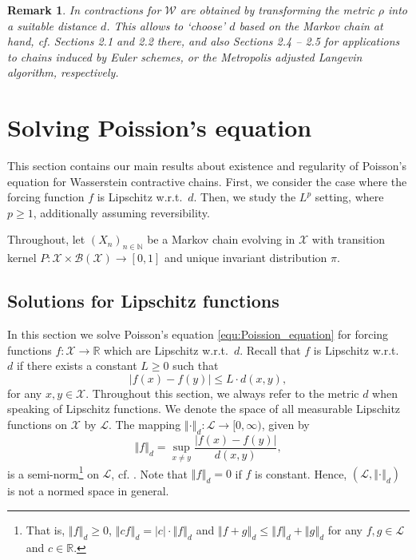 \documentclass[12pt]{article}
\theoremstyle{plain}
\newtheorem{rem}[thm]{Remark}
\newcommand{\norm}[1]{\left\Vert #1 \right\Vert}
\newcommand{\N}{\mathbb{N}}
\newcommand{\R}{\mathbb{R}}
\newcommand{\cX}{\mathcal{X}}
\begin{document}
{\begin{rem}
In \cite{eberle2019quantitative} contractions for $\mathcal{W}$ are obtained by transforming the metric $\rho$ into a suitable distance $d$.
This allows to `choose' $d$ based on the Markov chain at hand, cf. Sections 2.1 and 2.2 there, and also Sections 2.4 -- 2.5 for applications to chains induced by Euler schemes, or the Metropolis adjusted Langevin algorithm, respectively. 
\end{rem}



\section{Solving Poission's equation}\label{sec:Solutions}
This section contains our main results about existence and regularity of Poisson's equation for Wasserstein contractive chains. 
First, we consider the case where the forcing function $f$ is Lipschitz w.r.t.~$d$. 
Then, we study the $L^p$ setting, where $p \geq 1$, additionally assuming reversibility.   

Throughout, let $(X_n)_{n \in \N}$ be a Markov chain evolving in $\cX$ with transition kernel $P\colon \cX \times \mathcal{B}(\cX) \to [0,1]$ and unique invariant distribution $\pi$.
\subsection{Solutions for Lipschitz functions}
In this section we solve Poisson's equation \eqref{equ:Poission_equation} for forcing functions $f\colon \cX \to \R$ which are Lipschitz w.r.t.~$d$. 
Recall that $f$ is Lipschitz w.r.t.~$d$ if there exists a constant $L\geq0$ such that 
\begin{equation*}\label{equ:Lipschitz}
\vert f(x) - f(y) \vert \leq L \cdot  d(x,y),
\end{equation*}
for any $x,y \in \cX$. 
Throughout this section, we always refer to the metric $d$ when speaking of Lipschitz functions. 
We denote the space of all measurable Lipschitz functions on $\cX$ by $\mathscr{L}$.
The mapping $\norm{\cdot}_d \colon \mathscr{L} \to [0, \infty)$, given by 
\[
\norm{f}_d = \sup_{x \neq y} \frac{\vert f(x) - f(y)\vert}{d(x,y)},
\] 
is a semi-norm\footnote{That is, $\norm{f}_d \geq 0$,  $\norm{cf}_d = \vert c \vert \cdot \norm{f}_d$ and $\norm{f+g}_d \leq \norm{f}_d + \norm{g}_d$ for any $f,g \in \mathscr{L}$ and $c \in \R$.} on $\mathscr{L}$, cf. \cite{cobzacs2019lipschitz}. 
Note that $\norm{f}_d=0$ if $f$ is constant. 
Hence, $(\mathscr{L}, \norm{\cdot}_d)$ is not a normed space in general. 

}
\end{document}
